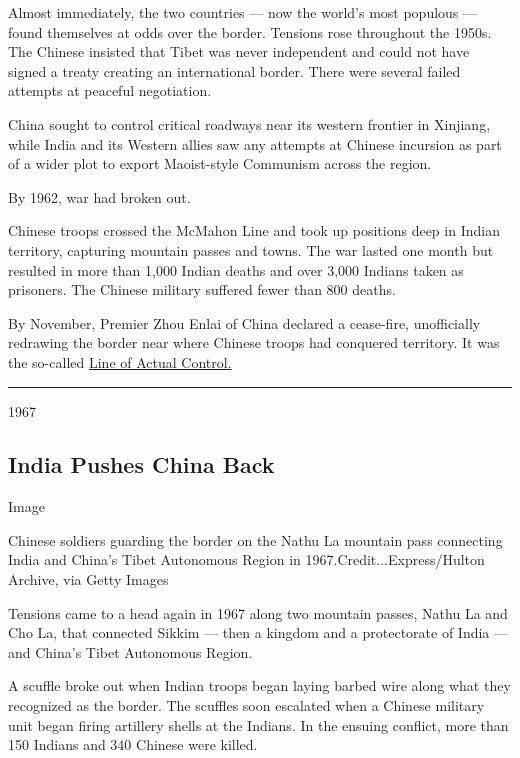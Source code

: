Almost immediately, the two countries --- now the world's most populous
--- found themselves at odds over the border. Tensions rose throughout
the 1950s. The Chinese insisted that Tibet was never independent and
could not have signed a treaty creating an international border. There
were several failed attempts at peaceful negotiation.

China sought to control critical roadways near its western frontier in
Xinjiang, while India and its Western allies saw any attempts at Chinese
incursion as part of a wider plot to export Maoist-style Communism
across the region.

By 1962, war had broken out.

Chinese troops crossed the McMahon Line and took up positions deep in
Indian territory, capturing mountain passes and towns. The war lasted
one month but resulted in more than 1,000 Indian deaths and over 3,000
Indians taken as prisoners. The Chinese military suffered fewer than 800
deaths.

By November, Premier Zhou Enlai of China declared a cease-fire,
unofficially redrawing the border near where Chinese troops had
conquered territory. It was the so-called
\href{https://www.nytimes.com/2020/06/16/world/asia/india-china-border.html}{Line
of Actual Control.}

\begin{center}\rule{0.5\linewidth}{\linethickness}\end{center}

1967

\hypertarget{india-pushes-china-back}{%
\subsection{India Pushes China Back}\label{india-pushes-china-back}}

Image

Chinese soldiers guarding the border on the Nathu La mountain pass
connecting India and China's Tibet Autonomous Region in
1967.Credit...Express/Hulton Archive, via Getty Images

Tensions came to a head again in 1967 along two mountain passes, Nathu
La and Cho La, that connected Sikkim --- then a kingdom and a
protectorate of India --- and China's Tibet Autonomous Region.

A scuffle broke out when Indian troops began laying barbed wire along
what they recognized as the border. The scuffles soon escalated when a
Chinese military unit began firing artillery shells at the Indians. In
the ensuing conflict, more than 150 Indians and 340 Chinese were killed.

